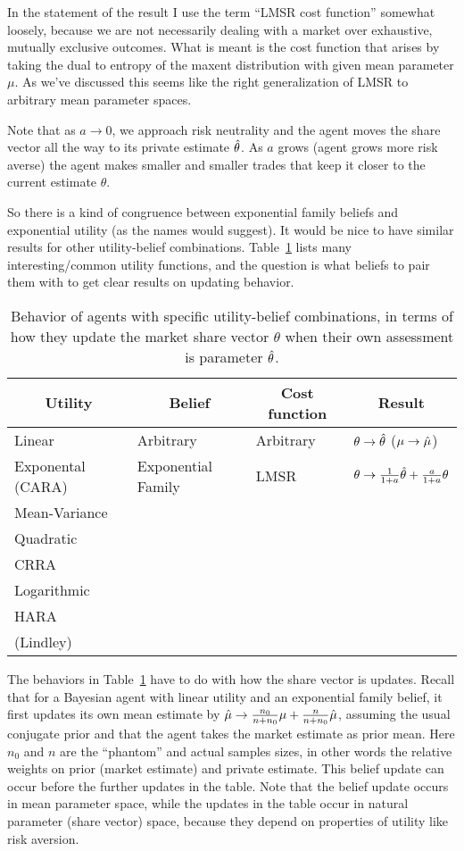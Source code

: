 In the statement of the result I use the term ``LMSR cost function'' somewhat loosely, because we are not necessarily dealing with a market over exhaustive, mutually exclusive outcomes. What is meant is the cost function that arises by taking the dual to entropy of the maxent distribution with given mean parameter $\mu$. As we've discussed this seems like the right generalization of LMSR to arbitrary mean parameter spaces. 

Note that as $a \rightarrow 0$, we approach risk neutrality and the agent moves the share vector all the way to its private estimate $\hat{\theta}$. As $a$ grows (agent grows more risk averse) the agent makes smaller and smaller trades that keep it closer to the current estimate $\theta$.

So there is a kind of congruence between exponential family beliefs and exponential utility (as the names would suggest). It would be nice to have similar results for other utility-belief combinations. Table~\ref{tab:util-belief} lists many interesting/common utility functions, and the question is what beliefs to pair them with to get clear results on updating behavior.

%
\begin{table}[ht]
\begin{tabular}{llll}
\toprule
\multicolumn{1}{c}{Utility} &
\multicolumn{1}{c}{Belief} & 
\multicolumn{1}{c}{Cost function} & 
\multicolumn{1}{c}{Result} \\ \midrule
Linear & Arbitrary & Arbitrary & $\theta \rightarrow \hat{\theta}$ ($\mu \rightarrow \hat{\mu}$) \\
Exponental (CARA) & Exponential Family & LMSR & $\theta \rightarrow \frac{1}{1+a} \hat{\theta} + \frac{a}{1+a} \theta$ \\
Mean-Variance &&& \\
Quadratic &&& \\
CRRA &&& \\
Logarithmic &&& \\
HARA &&& \\
(Lindley) &&& \\
\bottomrule
\end{tabular}
\caption{Behavior of agents with specific utility-belief combinations, in terms of how they update the market share vector $\theta$ when their own assessment is parameter $\hat{\theta}$.\label{tab:util-belief}}
\end{table}
%

The behaviors in Table~\ref{tab:util-belief} have to do with how the share vector is updates. Recall that for a Bayesian agent with linear utility and an exponential family belief, it first updates its own mean estimate by $\hat{\mu} \rightarrow \frac{n_0}{n+n_0} \mu + \frac{n}{n+n_0} \hat{\mu}$, assuming the usual conjugate prior and that the agent takes the market estimate as prior mean. Here $n_0$ and $n$ are the ``phantom'' and actual samples sizes, in other words the relative weights on prior (market estimate) and private estimate. This belief update can occur before the further updates in the table. Note that the belief update occurs in mean parameter space, while the updates in the table occur in natural parameter (share vector) space, because they depend on properties of utility like risk aversion.


